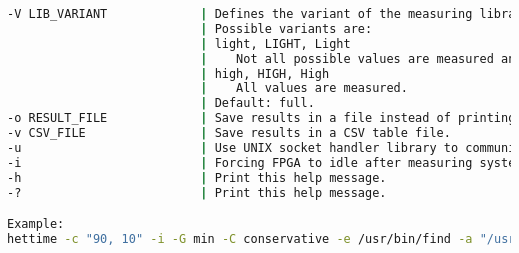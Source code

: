 \begin{landscape}
\begin{lstlisting}[language=sh,stringstyle=\color{black},keywordstyle=\color{black}]
-V LIB_VARIANT             | Defines the variant of the measuring library which is used.
                           | Possible variants are:
                           | light, LIGHT, Light
                           |    Not all possible values are measured and therefore the CPU utilization is lower.
                           | high, HIGH, High
                           |    All values are measured.
                           | Default: full.
-o RESULT_FILE             | Save results in a file instead of printing to stdout.
-v CSV_FILE                | Save results in a CSV table file.
-u                         | Use UNIX socket handler library to communicate with msmonitor.
-i                         | Forcing FPGA to idle after measuring system initialization.
-h                         | Print this help message.
-?                         | Print this help message.

Example:
hettime -c "90, 10" -i -G min -C conservative -e /usr/bin/find -a "/usr -iname lib*"
\end{lstlisting}
\end{landscape}

